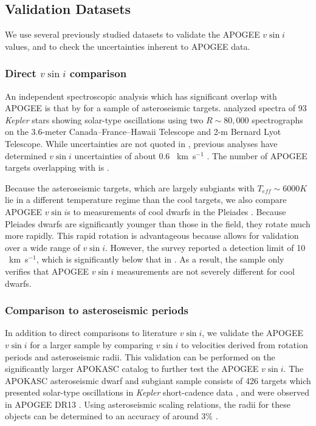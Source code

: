 \documentclass[manuscript]{aastex6}
\newcommand{\vsini}{\ensuremath{v \sin i}}
\newcommand{\Kepler}{\mbox{\textit{Kepler}}}
\newcommand{\Teff}{\ensuremath{T_{eff}}}
\newcommand{\kms}{\textrm{~km~s}\ensuremath{^{-1}}}
\newcommand{\gvs}{\authorcomment1}
\begin{document}
\subsection{Validation Datasets}

We use several previously studied datasets to validate the APOGEE
\vsini{} values, and to check the uncertainties inherent to APOGEE data.

\subsubsection{Direct \vsini{} comparison}

An independent spectroscopic analysis which has significant overlap with APOGEE
is that by \citet{Bruntt12} for a sample of asteroseismic targets.
\citet{Bruntt12} analyzed spectra of 93 \Kepler{} stars showing solar-type
oscillations using two \(R \sim 80,000\) spectrographs 
on the 3.6-meter Canada--France--Hawaii Telescope and 2-m Bernard Lyot
Telescope. While uncertainties are not quoted in \citet{Bruntt12},
previous analyses have determined \vsini{} uncertainties of about 0.6
\kms{} \citep{Bruntt10a,Bruntt10b}. \gvs{Check this number more carefully.} The
number of APOGEE targets overlapping with \citet{Bruntt12} is \gvs{NUM}.

Because the \citet{Bruntt12} asteroseismic targets, which are largely subgiants with
\(\Teff \sim 6000 K\) lie in a different temperature regime than the cool
targets, we also compare APOGEE \vsini{}s to measurements of cool 
dwarfs in the Pleiades \citep{Stauffer87}. Because Pleiades dwarfs are 
significantly younger than those in the field,
they rotate much more rapidly. This rapid rotation is advantageous
because allows for validation over a wide range of \vsini{}. However, 
the \citet{Stauffer87} survey 
reported a detection limit of 10 \kms, which is significantly below that in
\citet{Bruntt12}. As a result, the \citet{Stauffer87} sample only
verifies that APOGEE \vsini{} measurements are not severely different
for cool dwarfs.

\subsubsection{Comparison to asteroseismic periods}

In addition to direct comparisons to literature \vsini{}, we validate the 
APOGEE \vsini{} for a larger sample by comparing \vsini{} to velocities derived
from rotation periods and asteroseismic radii. This validation can be performed
on the significantly larger APOKASC catalog
\citep{Pinsonneault14,Pinsonneault18} to further test the APOGEE \vsini. The 
APOKASC asteroseismic dwarf and subgiant 
sample consists of 426 targets which presented solar-type oscillations in 
\Kepler{} short-cadence data \citep{Chaplin11}, and were observed in APOGEE DR13
\citep{Majewski17}. Using asteroseismic scaling relations, the radii
for these objects can be determined to an accuracy of around 3\%
\citep{Serenelli17}. 
\end{document}
